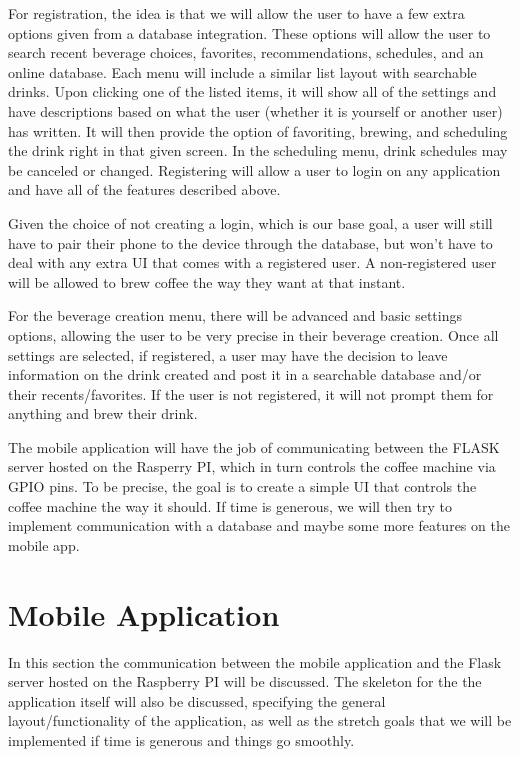\documentclass[conference]{IEEEtran}
\begin{document}
For registration, the idea is that we will allow the user to have a few extra options given from a database
integration. These options will allow the user to search recent beverage
choices, favorites, recommendations, schedules, and an online database. Each
menu will include a similar list layout with searchable drinks. Upon clicking
one of the listed items, it will show all of the settings and have descriptions
based on what the user (whether it is yourself or another user) has written. It
will then provide the option of favoriting, brewing, and scheduling the drink
right in that given screen. In the scheduling menu, drink schedules may be
canceled or changed. Registering will allow a user to login on
any application and have all of the features described above.

Given the choice of not creating a login, which is our base goal, a user will still have to pair their
phone to the device through the database, but won't have to deal with any extra
UI that comes with a registered user. A non-registered user will be allowed to
brew coffee the way they want at that instant. 

For the beverage creation menu, there will be advanced and basic settings options, allowing the user to be very
precise in their beverage creation. Once all settings are selected, if
registered, a user may have the decision to leave information on the drink
created and post it in a searchable database and/or their recents/favorites.
If the user is not registered, it will not prompt them for anything and brew their drink. 

The mobile application
will have the job of communicating between the FLASK server hosted on the 
Rasperry PI, which in turn controls the coffee machine via GPIO pins. To be
precise, the goal is to create a simple UI that controls the coffee machine the way it should.
If time is generous, we will then try to implement communication with a database and
maybe some more features on the mobile app.


\section{Mobile Application}

In this section the communication between the mobile application and the Flask
server hosted on the Raspberry PI will be discussed. The skeleton for the the application itself will
also be discussed, specifying the general layout/functionality of the application, as
well as the stretch goals that we will be implemented if time is generous and things
go smoothly.
\end{document}
